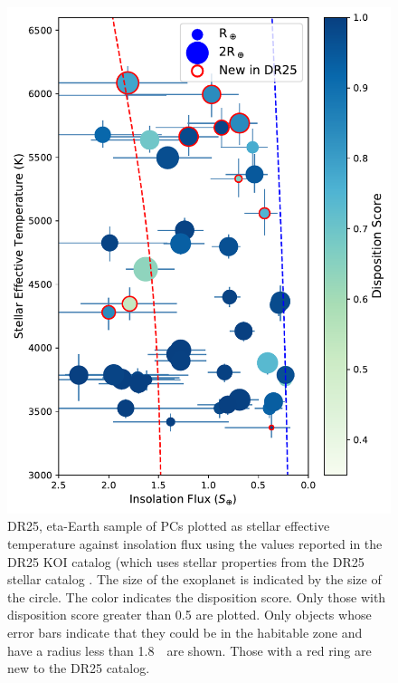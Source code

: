 \begin{figure}[tb]
    \centering
    \includegraphics[width=\linewidth]{f14.pdf}
    \caption{DR25, eta-Earth sample of PCs plotted as stellar effective temperature against insolation flux using the values reported in the DR25 KOI catalog (which uses stellar properties from the DR25 stellar catalog \citep{Mathur2017ApJS}. The size of the exoplanet is indicated by the size of the circle.  The color indicates the disposition score. Only those with disposition score greater than 0.5 are plotted.  Only objects whose error bars indicate that they could be in the habitable zone and have a radius less than 1.8~\re\ are shown. Those with a red ring are new to the DR25 catalog. }
    \label{f:hzPlot}
\end{figure}


